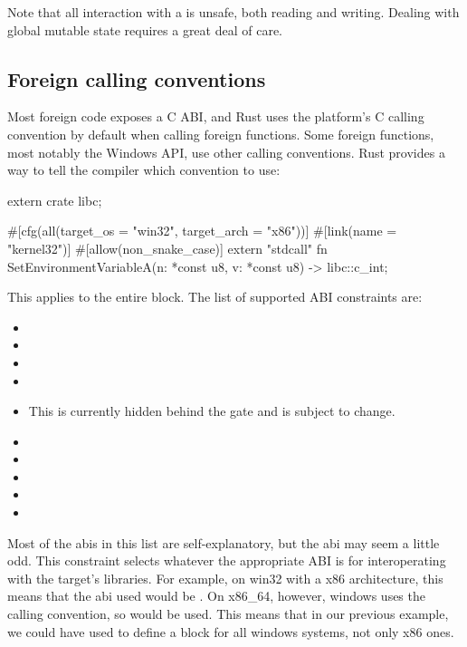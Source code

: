 Note that all interaction with a  is unsafe, both reading and writing. Dealing with global mutable 
state requires a great deal of care.

\subsection*{Foreign calling conventions}

Most foreign code exposes a C ABI, and Rust uses the platform's C calling convention by default when calling foreign 
functions. Some foreign functions, most notably the Windows API, use other calling conventions. Rust provides a way to 
tell the compiler which convention to use:

\begin{rustc}
extern crate libc;

#[cfg(all(target_os = "win32", target_arch = "x86"))]
#[link(name = "kernel32")]
#[allow(non_snake_case)]
extern "stdcall" {
    fn SetEnvironmentVariableA(n: *const u8, v: *const u8) -> libc::c_int;
}
\end{rustc}

This applies to the entire  block. The list of supported ABI constraints are:

\begin{itemize}
  \item{}
  \item{}
  \item{}
  \item{}
  \item{ This is currently hidden behind the  gate and is subject to change.}
  \item{}
  \item{}
  \item{}
  \item{}
  \item{}
\end{itemize}

Most of the abis in this list are self-explanatory, but the  abi may seem a little odd. This constraint 
selects whatever the appropriate ABI is for interoperating with the target's libraries. For example, on win32 with a x86 
architecture, this means that the abi used would be . On x86\_64, however, windows uses the  calling 
convention, so  would be used. This means that in our previous example, we could have used 
 to define a block for all windows systems, not only x86 ones.

